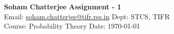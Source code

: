 \documentclass[a4paper, 11pt]{article}
\begin{document}
	
	
	\textsf{\noindent \large\textbf{Soham Chatterjee} \hfill \textbf{Assignment - 1}\\
		Email: \href{soham.chatterjee@tifr.res.in}{soham.chatterjee@tifr.res.in} \hfill Dept: STCS, TIFR\\
		\normalsize Course: Probability Theory \hfill Date: \today}
	
	
\end{document}
